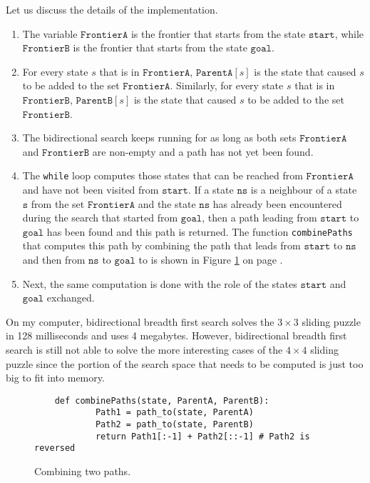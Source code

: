 Let us discuss the details of the implementation.
\begin{enumerate}
\item The variable $\texttt{FrontierA}$ is the frontier that starts from the state $\texttt{start}$, while
      $\texttt{FrontierB}$ is the frontier that starts from the state $\texttt{goal}$.
\item For every state $s$ that is in $\texttt{FrontierA}$, $\mathtt{ParentA}[s]$ is the state that caused $s$
      to be added to the set $\texttt{FrontierA}$.  Similarly, for every state $s$ that is in $\texttt{FrontierB}$,
      $\mathtt{ParentB}[s]$ is the state that caused $s$ to be added to the set $\texttt{FrontierB}$.
\item The bidirectional search keeps running for as long as both sets $\texttt{FrontierA}$ and
      $\texttt{FrontierB}$ are non-empty and a path has not yet been found.
\item The \texttt{while} loop computes those states that can be reached from $\texttt{FrontierA}$ and have not been
      visited from $\texttt{start}$.  If a state $\texttt{ns}$ is a neighbour of a state $\texttt{s}$ from the set
      $\texttt{FrontierA}$ and the state $\texttt{ns}$ has already been encountered during the search that started
      from $\texttt{goal}$, then a path leading from $\texttt{start}$ to $\texttt{goal}$ has been found and this path
      is returned.  The function \texttt{combinePaths} that computes this path by combining the path that leads
      from $\texttt{start}$ to $\texttt{ns}$ and then from $\texttt{ns}$ to $\texttt{goal}$ to is shown in Figure
      \ref{fig:combine-paths.stlx} on page \pageref{fig:combine-paths.stlx}.
\item Next, the same computation is done with the role of the states $\texttt{start}$ and $\texttt{goal}$ exchanged.
\end{enumerate}
On my computer, bidirectional breadth first search solves the $3 \times 3$ sliding puzzle in 128
milliseconds and uses 4 megabytes.  However, bidirectional breadth first search is still not able to solve the
more interesting cases of the $4 \times 4$ sliding puzzle since the portion of the search space that needs to
be computed is just too big to fit into memory. 

\begin{figure}[!ht]
\centering
\begin{verbatim}
    def combinePaths(state, ParentA, ParentB):
            Path1 = path_to(state, ParentA)
            Path2 = path_to(state, ParentB)
            return Path1[:-1] + Path2[::-1] # Path2 is reversed
\end{verbatim}
\vspace*{-0.3cm}
\caption{Combining two paths.}
\label{fig:combine-paths.stlx}
\end{figure}

